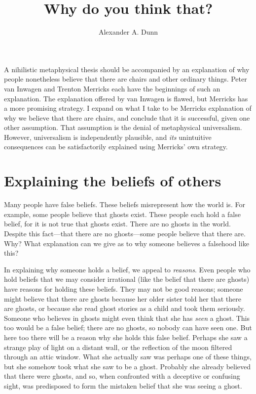 \documentclass[11pt]{article}
\title{Why do you think that?}
\author{Alexander A. Dunn}
\begin{document}
\ifstandalone
\maketitle
\begin{spacing}{1.5}
\fi
\label{stroud}

A nihilistic metaphysical thesis should be accompanied by an
explanation of why people nonetheless believe that there are chairs
and other ordinary things.  Peter van Inwagen and Trenton Merricks
each have the beginnings of such an explanation.  The explanation
offered by van Inwagen is flawed, but Merricks has a more promising
strategy.  I expand on what I take to be Merricks explanation of why
we believe that there are chairs, and conclude that it is successful,
given one other assumption.  That assumption is the denial of
metaphysical universalism.  However, universalism is independently
plausible, and {\em its} unintuitive consequences can be
satisfactorily explained using Merricks' own strategy.

\section{Explaining the beliefs of others}
\label{intro-beliefs}
\noindent Many people have false beliefs.  These beliefs misrepresent
how the world is.  For example, some people believe that ghosts exist.
These people each hold a false belief, for it is not true that ghosts
exist.  There are no ghosts in the world.  Despite this fact---that
there are no ghosts---some people believe that there are.  Why?  What
explanation can we give as to why someone believes a falsehood like
this?

In explaining why someone holds a belief, we appeal to {\em reasons}.
Even people who hold beliefs that we may consider irrational (like the
belief that there are ghosts) have reasons for holding these beliefs.
They may not be good reasons; someone might believe that there are
ghosts because her older sister told her that there are ghosts, or
because she read ghost stories as a child and took them seriously.
Someone who believes in ghosts might even think that she has {\em
  seen} a ghost.  This too would be a false belief; there are no
ghosts, so nobody can have seen one.  But here too there will be a
reason why she holds this false belief.  Perhaps she saw a strange
play of light on a distant wall, or the reflection of the moon
filtered through an attic window.  What she actually saw was perhaps
one of these things, but she somehow took what she saw to be a ghost.
Probably she already believed that there were ghosts, and so, when
confronted with a deceptive or confusing sight, was predisposed to
form the mistaken belief that she was seeing a ghost.


\end{spacing}
\end{document}

